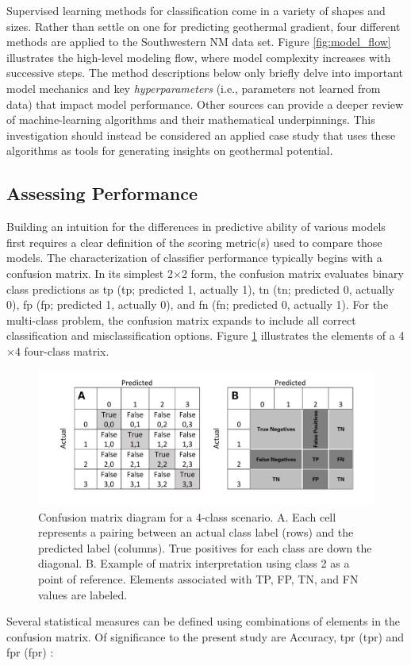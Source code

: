 Supervised learning methods for classification come in a variety of shapes and sizes. Rather than settle on one for predicting geothermal gradient, four different methods are applied to the Southwestern NM data set. Figure \ref{fig:model_flow} illustrates the high-level modeling flow, where model complexity increases with successive steps. The method descriptions below only briefly delve into important model mechanics and key \textit{hyperparameters} (i.e., parameters not learned from data) that impact model performance. Other sources can provide a deeper review of machine-learning algorithms and their mathematical underpinnings. This investigation should instead be considered an applied case study that uses these algorithms as tools for generating insights on geothermal potential.

\subsection{Assessing Performance}\label{ch3:modeling_assessments}
Building an intuition for the differences in predictive ability of various models first requires a clear definition of the scoring metric(s) used to compare those models. The characterization of classifier performance typically begins with a confusion matrix. In its simplest 2$\times$2 form, the confusion matrix evaluates binary class predictions as \acrlong{tp} (\acrshort{tp}; predicted 1, actually 1), \acrlong{tn} (\acrshort{tn}; predicted 0, actually 0), \acrlong{fp} (\acrshort{fp}; predicted 1, actually 0), and \acrlong{fn} (\acrshort{fn}; predicted 0, actually 1). For the multi-class problem, the confusion matrix expands to include all correct classification and misclassification options. Figure \ref{fig:confusion_matrix} illustrates the elements of a 4$\times$4 four-class matrix.

\begin{figure}[!htp]
\centering
\includegraphics[width=\textwidth]{templates/images/Figure-Confusion_Matrix.png}
\caption[Example four-class confusion matrix]{Confusion matrix diagram for a 4-class scenario. A. Each cell represents a pairing between an actual class label (rows) and the predicted label (columns). True positives for each class are down the diagonal. B. Example of matrix interpretation using class 2 as a point of reference. Elements associated with TP, FP, TN, and FN values are labeled.}
\label{fig:confusion_matrix}
\end{figure}
Several statistical measures can be defined using combinations of elements in the confusion matrix. Of significance to the present study are Accuracy, \acrlong{tpr} (\acrshort{tpr}) and \acrlong{fpr} (\acrshort{fpr}) \citep{tharwat_classification_2020}:

